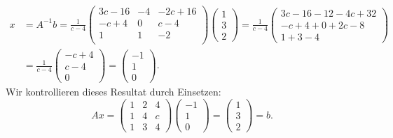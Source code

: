\begin{loesung}
\begin{teilaufgaben}
\begin{align*}
x&=
A^{-1}b=
\frac{1}{c-4}
\begin{pmatrix}
3c-16&-4& -2c+16\\
-c+ 4& 0&   c- 4\\
    1& 1&    - 2\\
\end{pmatrix}
\begin{pmatrix}1\\3\\2\end{pmatrix}
=
\frac{1}{c-4}
\begin{pmatrix}
3c-16-12-4c+32\\
-c+4+0+2c-8\\
1+3-4
\end{pmatrix}
\\
&=
\frac{1}{c-4}
\begin{pmatrix}
-c+4\\
c-4\\
0
\end{pmatrix}
=\begin{pmatrix}
-1\\1\\0
\end{pmatrix}.
\end{align*}
Wir kontrollieren dieses Resultat durch Einsetzen:
\[
Ax=
\begin{pmatrix}
1&2&4\\
1&4&c\\
1&3&4
\end{pmatrix}
\begin{pmatrix}
-1\\1\\0
\end{pmatrix}
=
\begin{pmatrix}
1\\3\\2
\end{pmatrix}=b.
\]

\end{teilaufgaben}
\end{loesung}
